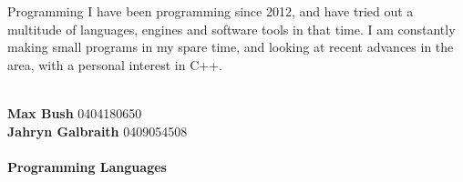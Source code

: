 \documentclass[9pt]{developercv}
\newcommand{\CC}{C\nolinebreak\hspace{-.05em}\raisebox{.4ex}{\tiny\bf +}\nolinebreak\hspace{-.10em}\raisebox{.4ex}{\tiny\bf +}}
\def\CC{{C\nolinebreak[4]\hspace{-.05em}\raisebox{.4ex}{\tiny\bf ++}}}
\begin{document}
\begin{minipage}[t]{0.6\textwidth}
\begin{entrylist}
		\end{entrylist}
		\begin{entrylist}
			\entry
				{\vphantom{1.0}}
				{Programming}
				{}
				{I have been programming since 2012, and have tried out a multitude of languages, engines and software tools in that time. I am constantly making small programs in my spare time, and looking at recent advances in the area, with a personal interest in C++.}
		\end{entrylist}
	\end{minipage}
\begin{minipage}[t]{0.1\textwidth}
\hphantom{0.1}
\end{minipage}
	\begin{minipage}[t]{0.3\textwidth}
		\\
		\textbf{Max Bush} 0404180650\\
		\textbf{Jahryn Galbraith} 0409054508\\

			\\\textbf{Programming Languages}\\
			\begin{barchart}{3.0}
				\baritem{\CC}{100}
			\end{barchart}
	\end{minipage}
\end{document}
